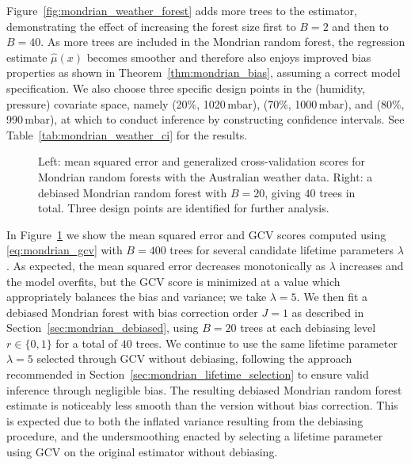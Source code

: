 \documentclass[11pt,lof]{puthesis}
\theoremstyle{break}
\theoremstyle{proof}
\begin{document}
Figure~\ref{fig:mondrian_weather_forest} adds more trees to the estimator,
demonstrating the effect of increasing the forest size first to $B=2$
and then to $B=40$.
As more trees are included in the Mondrian random forest,
the regression estimate $\hat \mu(x)$ becomes smoother and therefore also
enjoys improved bias properties as shown in
Theorem~\ref{thm:mondrian_bias}, assuming a correct model specification.
We also choose three specific design points in the
(humidity, pressure) covariate space,
namely (20\%, 1020\,mbar), (70\%, 1000\,mbar), and (80\%, 990\,mbar),
at which to conduct inference
by constructing confidence intervals. See Table~\ref{tab:mondrian_weather_ci}
for the results.

\begin{figure}[b!]
  \centering
  \begin{subfigure}{0.49\textwidth}
    \centering
  \end{subfigure}
  \begin{subfigure}{0.49\textwidth}
    \centering
  \end{subfigure}
  \caption[Cross-validation and debiasing for the Australian weather data]{
    Left: mean squared error and generalized cross-validation scores
    for Mondrian random forests with the Australian weather data.
    Right: a debiased Mondrian random forest with $B=20$, giving $40$ trees
  in total. Three design points are identified for further analysis.}
  \label{fig:mondrian_weather_gcv}
\end{figure}

In Figure~\ref{fig:mondrian_weather_gcv} we show the mean squared error and GCV
scores computed using \eqref{eq:mondrian_gcv} with $B=400$ trees for several
candidate lifetime parameters $\lambda$. As expected, the mean squared error
decreases monotonically as $\lambda$ increases and the model overfits, but the
GCV score is minimized at a value which appropriately balances the bias and
variance; we take $\lambda = 5$.
We then fit a debiased Mondrian forest
with bias correction order $J = 1$ as described in
Section~\ref{sec:mondrian_debiased}, using $B=20$ trees at each debiasing level
$r \in \{0, 1\}$ for a total of $40$ trees.
We continue to use the same lifetime parameter
$\lambda = 5$ selected through GCV without debiasing, following the approach
recommended in Section~\ref{sec:mondrian_lifetime_selection} to ensure valid
inference through negligible bias.
The resulting debiased Mondrian random forest estimate is noticeably
less smooth than the version without bias correction.
This is expected due to both the inflated variance resulting from the debiasing
procedure, and the undersmoothing enacted by selecting a lifetime parameter
using GCV on the original estimator without debiasing.
\end{document}
